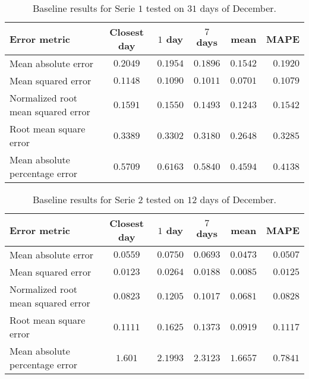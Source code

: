 \begin{table}[ht]
	\centering
	\begin{tabular}{@{}l|ccccr@{}} \toprule
		\textbf{Error metric}	& \textbf{Closest day} & \textbf{$ 1 $ day} & \textbf{$ 7 $ days} & \textbf{mean} & \textbf{MAPE}\\\midrule
		Mean absolute error& \cellcolor{red!25}$0.2049 $&$ 0.1954 $  & $0.1896 $ & \cellcolor{green!25}$ 0.1542 $ & $ 0.1920 $\\
		Mean squared error& \cellcolor{red!25}$0.1148 $&$ 0.1090 $  & $0.1011 $ & \cellcolor{green!25}$ 0.0701 $ & $ 0.1079 $\\
		Normalized root mean squared error& \cellcolor{red!25}$0.1591 $&$ 0.1550$  & $0.1493$ & \cellcolor{green!25}$ 0.1243$ & $ 0.1542$\\
		Root mean square error&\cellcolor{red!25} $0.3389 $&$ 0.3302$  & $0.3180$ & \cellcolor{green!25}$ 0.2648$ & $ 0.3285$\\
		Mean absolute percentage error & $ 0.5709 $&\cellcolor{red!25}$ 0.6163 $  & $ 0.5840 $ & $ 0.4594 $ & \cellcolor{green!25}$ 0.4138 $\\\bottomrule
	\end{tabular}
	\caption{Baseline results for Serie $ 1 $ tested on $ 31 $ days of December.}
	\label{tab:summ_data_serie1}
\end{table}


\begin{table}[ht]
	\centering
	\begin{tabular}{@{}l|ccccr@{}} \toprule
		\textbf{Error metric}	& \textbf{Closest day} & \textbf{$ 1 $ day} & \textbf{$ 7 $ days} & \textbf{mean} & \textbf{MAPE}\\\midrule
		Mean absolute error& $0.0559 $&\cellcolor{red!25}$ 0.0750 $  & $0.0693 $ & \cellcolor{green!25}$ 0.0473 $ & $ 0.0507 $\\
		Mean squared error& $0.0123 $&\cellcolor{red!25}$ 0.0264 $  & $0.0188 $ & \cellcolor{green!25}$ 0.0085 $ & $ 0.0125 $\\
		Normalized root mean squared error& $0.0823 $&\cellcolor{red!25}$ 0.1205$  & $0.1017$ & \cellcolor{green!25}$ 0.0681$ & $ 0.0828$\\
		Root mean square error& $0.1111 $&$ 0.1625$  &\cellcolor{red!25} $0.1373$ & \cellcolor{green!25}$ 0.0919$ & $ 0.1117$\\
		Mean absolute percentage error & $ 1.601 $&$ 2.1993 $  &\cellcolor{red!25} $ 2.3123 $ & $ 1.6657 $ & \cellcolor{green!25}$ 0.7841 $\\\bottomrule
	\end{tabular}
	\caption{Baseline results for Serie $ 2 $ tested on $ 12 $ days of December.}
	\label{tab:summ_data_serie2}
\end{table}

